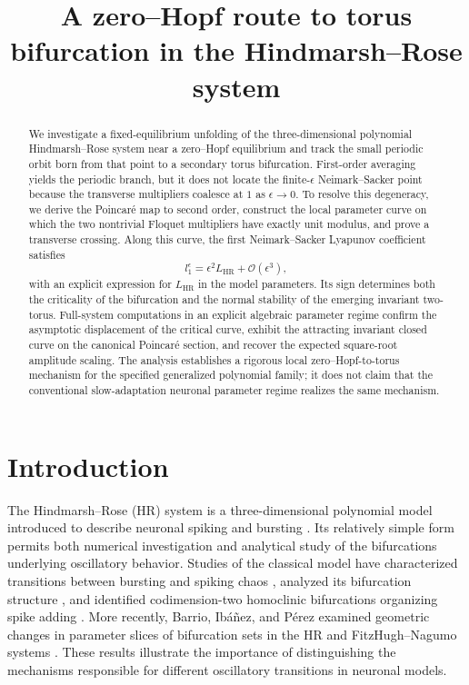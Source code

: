 \documentclass[11pt]{amsart}
\title[A zero--Hopf route to torus bifurcation]{A zero--Hopf route to torus bifurcation in the Hindmarsh--Rose system}
\author{}
\date{}
\theoremstyle{remark}
\begin{document}
\begin{abstract}
We investigate a fixed-equilibrium unfolding of the three-dimensional
polynomial Hindmarsh--Rose system near a zero--Hopf equilibrium and track the
small periodic orbit born from that point to a secondary torus bifurcation.
First-order averaging yields the periodic branch, but it does not locate the
finite-\(\epsilon\) Neimark--Sacker point because the transverse multipliers
coalesce at \(1\) as \(\epsilon\to0\).  To resolve this degeneracy, we derive
the Poincar\'e map to second order, construct the local parameter curve on
which the two nontrivial Floquet multipliers have exactly unit modulus, and
prove a transverse crossing.  Along this curve, the first
Neimark--Sacker Lyapunov coefficient satisfies
\[
 l_1^\epsilon=\epsilon^2 L_{\mathrm{HR}}+\mathcal{O}(\epsilon^3),
\]
with an explicit expression for \(L_{\mathrm{HR}}\) in the model parameters.
Its sign determines both the criticality of the bifurcation and the normal
stability of the emerging invariant two-torus.  Full-system computations in
an explicit algebraic parameter regime confirm the asymptotic displacement
of the critical curve, exhibit the attracting invariant closed curve on the
canonical Poincar\'e section, and recover the expected square-root amplitude
scaling.  The analysis establishes a rigorous local zero--Hopf-to-torus
mechanism for the specified generalized polynomial family; it does not claim
that the conventional slow-adaptation neuronal parameter regime realizes the
same mechanism.
\end{abstract}

\maketitle

\section*{Introduction}

The Hindmarsh--Rose (HR) system is a three-dimensional polynomial model
introduced to describe neuronal spiking and bursting
\cite{HindmarshRose1984}. Its relatively simple form permits both numerical
investigation and analytical study of the bifurcations underlying
oscillatory behavior. Studies of the classical model have characterized
transitions between bursting and spiking chaos
\cite{InnocentiMorelliGenesioTorcini2007}, analyzed its bifurcation structure
\cite{StoraceLinaroDeLange2008}, and identified codimension-two homoclinic
bifurcations organizing spike adding
\cite{LinaroChampneysDesrochesStorace2012}. More recently, Barrio,
Ib\'{a}\~nez, and P\'{e}rez examined geometric changes in parameter slices
of bifurcation sets in the HR and FitzHugh--Nagumo systems
\cite{BarrioIbanezPerez2024}. These results illustrate the importance of
distinguishing the mechanisms responsible for different oscillatory
transitions in neuronal models.
\end{document}
